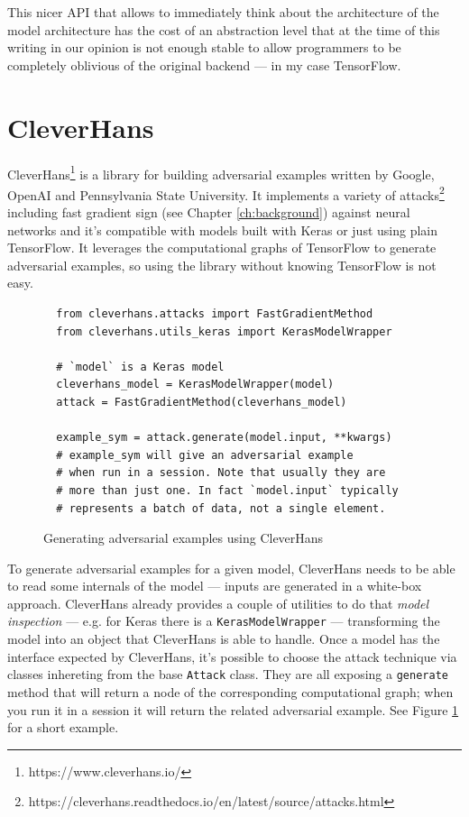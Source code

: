 This nicer API that allows to immediately think about the architecture
of the model
architecture has the cost of an abstraction level that at the time of
this writing in our opinion is not enough stable to allow programmers
to be completely oblivious of the original backend --- in my case
TensorFlow.

\section{CleverHans}
\label{sec:cleverhans}

CleverHans\footnote{https://www.cleverhans.io/} is a library for
building adversarial examples written by Google, OpenAI and
Pennsylvania State University. It implements a variety of
attacks\footnote{https://cleverhans.readthedocs.io/en/latest/source/attacks.html}
including fast gradient sign (see Chapter \ref{ch:background})
against neural networks and it's compatible with models built with
Keras or just using plain TensorFlow. It leverages the computational graphs
of TensorFlow to generate adversarial examples, so using the
library without knowing TensorFlow is not easy.

\begin{figure}
  \begin{verbatim}
  from cleverhans.attacks import FastGradientMethod
  from cleverhans.utils_keras import KerasModelWrapper

  # `model` is a Keras model
  cleverhans_model = KerasModelWrapper(model)
  attack = FastGradientMethod(cleverhans_model)

  example_sym = attack.generate(model.input, **kwargs)
  # example_sym will give an adversarial example
  # when run in a session. Note that usually they are
  # more than just one. In fact `model.input` typically
  # represents a batch of data, not a single element.
  \end{verbatim}
  \caption{Generating adversarial examples using CleverHans}
  \label{fig:cleverhans-attack-dot-generate}
\end{figure}

To generate adversarial examples for a given model, CleverHans needs to
be able to read some internals of the model --- inputs are generated in
a white-box approach. CleverHans already provides a couple of utilities
to do that \emph{model inspection} --- e.g. for Keras there is a
\texttt{KerasModelWrapper}
--- transforming the model into an object that CleverHans is able to
handle. Once a model has the interface expected by CleverHans, it's
possible to choose the attack technique via classes inhereting from the
base \texttt{Attack} class. They are all exposing a \texttt{generate}
method that will return a node of the corresponding computational
graph; when you run it in a session it will return the related
adversarial example. See Figure
\ref{fig:cleverhans-attack-dot-generate} for a short example.


